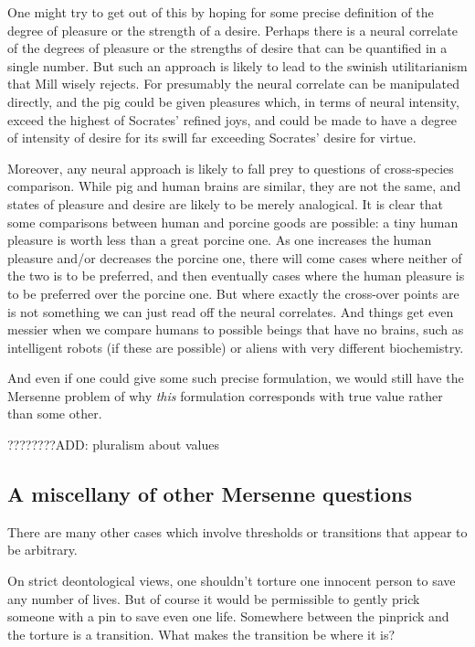 One might try to get out of this by hoping for some precise definition of the degree of pleasure or the strength of a desire.
Perhaps there is a neural correlate of the degrees of pleasure or the strengths of desire that can be quantified in a single
number. But such an approach is likely to lead to the swinish utilitarianism that Mill wisely rejects. For presumably the
neural correlate can be manipulated directly, and the pig could be given pleasures which, in terms of neural intensity,
exceed the highest of Socrates' refined joys, and could be made to have a degree of intensity of desire for its swill far
exceeding Socrates' desire for virtue.  

Moreover, any neural approach is likely to fall prey to questions of cross-species comparison. While pig and human brains are
similar, they are not the same, and states of pleasure and desire are likely to be merely analogical. It is clear that some
comparisons between human and porcine goods are possible: a tiny human pleasure is worth less than a great porcine one. As one
increases the human pleasure and/or decreases the porcine one, there will come cases where neither of the two is to be
preferred, and then eventually cases where the human pleasure is to be preferred over the porcine one. But where exactly
the cross-over points are is not something we can just read off the neural correlates. And things get even messier when we
compare humans to possible beings that have no brains, such as intelligent robots (if these are possible) or aliens with very 
different biochemistry.

And even if one could give some such precise formulation, we would still have
the Mersenne problem of why \textit{this} formulation corresponds with true value rather than some other. 

????????ADD: pluralism about values

\subsection{A miscellany of other Mersenne questions}
There are many other cases which involve thresholds or transitions that appear to be arbitrary.

On strict deontological views, one shouldn't torture one innocent person to save any number of lives. But of course
it would be permissible to gently prick someone with a pin to save even one life. Somewhere between the pinprick
and the torture is a transition. What makes the transition be where it is?

